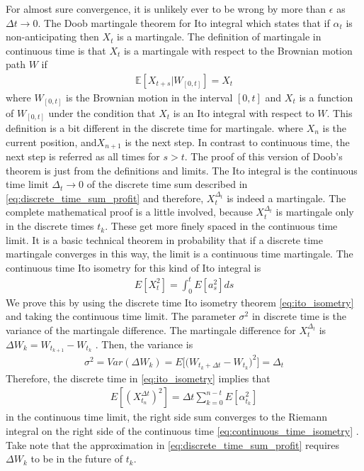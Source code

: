 For almost sure convergence, it is unlikely ever to be wrong by more than $\epsilon$  as $\Delta t \rightarrow 0$.  The Doob martingale theorem for Ito integral which states that  if $\alpha_t$ is non-anticipating then $X_t$ is a martingale. The definition of martingale in continuous time is that $X_t$ is a martingale with respect to the Brownian motion path $W$ if
\begin{align*}
\mathbb{E}\left[X_{t+s} \big| W_{[0,t]} \right] = X_t
\end{align*}
where $W_{[0,t]}$ is the Brownian motion in the interval $[0,t]$ and $X_t$ is a function of $W_{[0,t]}$ under the condition that $X_t$ is an Ito integral with respect to $W$. This definition is a bit different in the discrete time for martingale. where $X_n$ is the current position,  and$ X_{n+1}$ is the next step. In contrast to  continuous time, the next step is referred as all times for $s > t$.
The proof of this version of Doob's theorem is just from the definitions and limits. The Ito integral is the continuous time limit $\Delta_t \rightarrow 0$ of the discrete time sum described in \eqref{eq:discrete_time_sum_profit} and therefore, $X_t^{\Delta_t}$ is indeed a martingale. The complete mathematical proof is a little involved, because $X_t^{\Delta_t}$ is martingale only in the discrete times $t_k$. These get more finely spaced in the continuous time limit. It is a basic technical theorem in probability that if a discrete time martingale converges in this way, the limit is a continuous time martingale.
The continuous time Ito isometry for this kind of Ito integral is 
\begin{align}\label{eq:continuous_time_isometry}
E[X_t^2]=\int_0^t E[a_s^2] ds
\end{align}
We prove this by using the discrete time Ito isometry theorem \eqref{eq:ito_isometry} and taking the continuous time limit. The parameter $\sigma^2$ in discrete time is the variance of the martingale difference.  The martingale difference for $X_t^{\Delta_t}$ is $\Delta W_k= W_{t_{k+1}} - W_{t_k}$ . Then, the variance is
\begin{align*}
\sigma^2=Var(\Delta W_k) = E\bigg[ \big(W_{t_k+\Delta t} - W_{t_k} \big)^2 \bigg] = \Delta_t
\end{align*}
Therefore, the discrete time in \eqref{eq:ito_isometry}   implies that
\begin{align*}
E[(X_{t_n}^{\Delta t})^2] = \Delta t \sum_{k=0}^{n-t} E[\alpha_{t_k}^2]
\end{align*}
in the continuous time limit, the right side sum converges to the Riemann integral on the right side of the continuous time \eqref{eq:continuous_time_isometry} . Take note that the approximation in \eqref{eq:discrete_time_sum_profit}  requires $\Delta W_k$ to be in the future of $t_k$.

